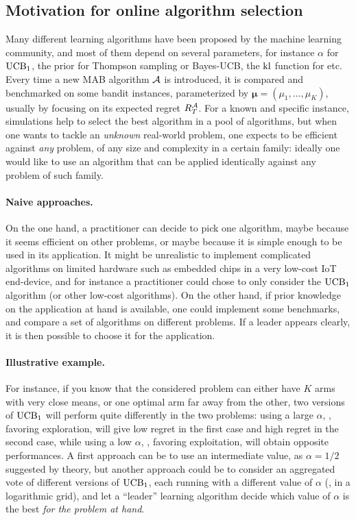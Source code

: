 \subsection{Motivation for online algorithm selection}\label{sub:25:introduction}

Many different learning algorithms have been proposed by the machine learning community,
and most of them depend on several parameters, for instance $\alpha$ for $\mathrm{UCB}_1$, the prior for Thompson sampling or Bayes-UCB,
the $\mathrm{kl}$ function for \klUCB{} etc.
Every time a new MAB algorithm $\mathcal{A}$ is introduced, it is compared and benchmarked on some bandit instances, parameterized by $\boldsymbol{\mu} = (\mu_1,\dots,\mu_K)$, usually by focusing on its expected regret $R_T^{\mathcal{A}}$.
%
For a known and specific instance, simulations help to select the best algorithm in a pool of algorithms,
but when one wants to tackle an \emph{unknown} real-world problem, one expects to be efficient against \emph{any} problem, of any size and complexity in a certain family:
ideally one would like to use an algorithm that can be applied identically against any problem of such family.


\paragraph{Naive approaches.}
%
On the one hand, a practitioner can decide to pick one algorithm, maybe because it seems efficient on other problems, or maybe because it is simple enough to be used in its application. It might be unrealistic to implement complicated algorithms on limited hardware such as embedded chips in a very low-cost IoT end-device, and for instance a practitioner could chose to only consider the $\mathrm{UCB}_1$ algorithm (or other low-cost algorithms).
%
On the other hand, if prior knowledge on the application at hand is available, one could implement some benchmarks, and compare a set of algorithms on different problems. If a leader appears clearly, it is then possible to choose it for the application.


\paragraph{Illustrative example.}
%
For instance, if you know that the considered problem can either have $K$ arms with very close means, or one optimal arm far away from the other, two versions of $\mathrm{UCB}_1$ will perform quite differently in the two problems:
using a large $\alpha$, \ie, favoring exploration, will give low regret in the first case and high regret in the second case,
while using a low $\alpha$, \ie, favoring exploitation, will obtain opposite performances.
A first approach can be to use an intermediate value, as $\alpha=1/2$ suggested by theory, but another approach could be to consider an aggregated vote of different versions of $\mathrm{UCB}_1$, each running with a different value of $\alpha$ (\eg, in a logarithmic grid), and let a ``leader'' learning algorithm decide which value of $\alpha$ is the best \emph{for the problem at hand}.


